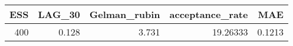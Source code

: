 \begin{longtable}{rrrrr}
\toprule
ESS & LAG\_30 & Gelman\_rubin & acceptance\_rate & MAE \\ 
\midrule
400 & 0.128 & 3.731 & 19.26333 & 0.1213 \\ 
\bottomrule
\end{longtable}

